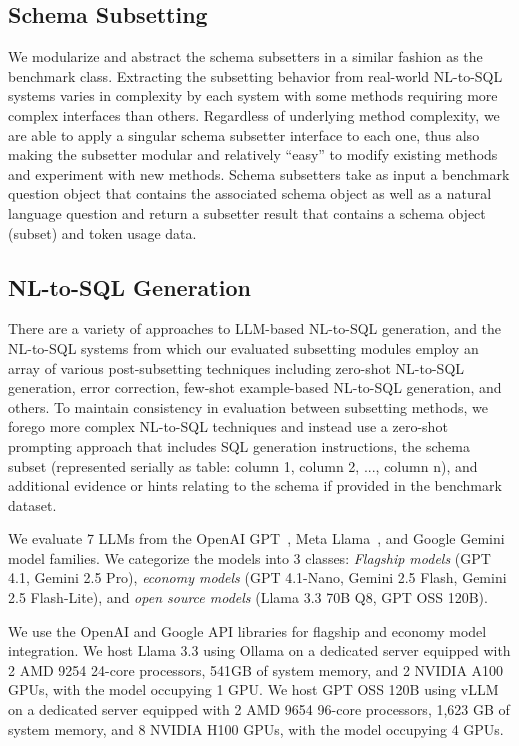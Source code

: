 \subsection{Schema Subsetting}
We modularize and abstract the schema subsetters in a similar fashion as the benchmark class.
Extracting the subsetting behavior from real-world NL-to-SQL systems varies in complexity by each system with some methods requiring more complex interfaces than others.
Regardless of underlying method complexity, we are able to apply a singular schema subsetter interface to each one, thus also making the subsetter modular and relatively ``easy'' to modify existing methods and experiment with new methods.
Schema subsetters take as input a benchmark question object that contains the associated schema object as well as a natural language question and return a subsetter result that contains a schema object (subset) and token usage data.

\subsection{NL-to-SQL Generation}
There are a variety of approaches to LLM-based NL-to-SQL generation, and the NL-to-SQL systems from which our evaluated subsetting modules employ an array of various post-subsetting techniques including zero-shot NL-to-SQL generation, error correction, few-shot example-based NL-to-SQL generation, and others.
To maintain consistency in evaluation between subsetting methods, we forego more complex NL-to-SQL techniques and instead use a zero-shot prompting approach that includes SQL generation instructions, the schema subset (represented serially as table: column 1, column 2, ..., column n), and additional evidence or hints relating to the schema if provided in the benchmark dataset.

We evaluate 7 LLMs from the OpenAI GPT~\cite{openai_gpt4.1_2024, openai2025gptoss120bgptoss20bmodel}, Meta Llama~\cite{grattafiori2024llama3herdmodels}, and Google Gemini~\cite{geminiteam2024gemini} model families.
We categorize the models into 3 classes: \emph{Flagship models} (GPT 4.1, Gemini 2.5 Pro), \emph{economy models} (GPT 4.1-Nano, Gemini 2.5 Flash, Gemini 2.5 Flash-Lite), and \emph{open source models} (Llama 3.3 70B Q8, GPT OSS 120B). 

We use the OpenAI and Google API libraries for flagship and economy model integration.
We host Llama 3.3 using Ollama on a dedicated server equipped with 2 AMD 9254 24-core processors, 541GB of system memory, and 2 NVIDIA A100 GPUs, with the model occupying 1 GPU.
We host GPT OSS 120B using vLLM on a dedicated server equipped with 2 AMD 9654 96-core processors, 1,623 GB of system memory, and 8 NVIDIA H100 GPUs, with the model occupying 4 GPUs.

